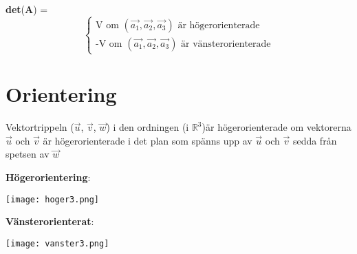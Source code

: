 \textbf{det}(\textbf{A}) =
\[
\begin{cases}
    \mbox{V om } (\vec{a_1},\vec{a_2},\vec{a_3}) \mbox{ är högerorienterade}\\
    \mbox{-V om } (\vec{a_1},\vec{a_2},\vec{a_3}) \mbox{ är vänsterorienterade}
\end{cases}
\]

\section{Orientering} %
\label{sec:orientering}

Vektortrippeln ($\vec{u}$, $\vec{v}$, $\vec{w}$) i den ordningen (i $\mathbb{R}^3$)är högerorienterade om vektorerna $\vec{u}$ och $\vec{v}$ är högerorienterade i det plan som spänns upp av $\vec{u}$ och $\vec{v}$ sedda från spetsen av $\vec{w}$
\begin{Ex}
    \textbf{Högerorientering}:
    \begin{center}
        \texttt{[image: hoger3.png]}
    \end{center}
\end{Ex}
\begin{Ex}
    \textbf{Vänsterorienterat}:
    \begin{center}
        \texttt{[image: vanster3.png]}
    \end{center}
\end{Ex}

